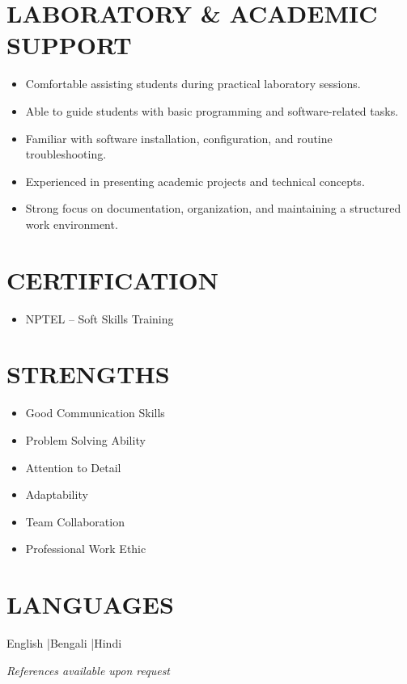 \documentclass[a4paper,10pt]{article}
\begin{document}
\section{LABORATORY \& ACADEMIC SUPPORT}
\begin{itemize}[leftmargin=*, noitemsep, topsep=2pt]
    \item Comfortable assisting students during practical laboratory sessions.
    \item Able to guide students with basic programming and software-related tasks.
    \item Familiar with software installation, configuration, and routine troubleshooting.
    \item Experienced in presenting academic projects and technical concepts.
    \item Strong focus on documentation, organization, and maintaining a structured work environment.
\end{itemize}

\section{CERTIFICATION}
\begin{itemize}[leftmargin=*, noitemsep, topsep=2pt]
    \item NPTEL – Soft Skills Training
\end{itemize}

\section{STRENGTHS}
\begin{itemize}[leftmargin=*, noitemsep, topsep=2pt, itemsep=2pt]
    \item Good Communication Skills
    \item Problem Solving Ability
    \item Attention to Detail
    \item Adaptability
    \item Team Collaboration
    \item Professional Work Ethic
\end{itemize}

\section{LANGUAGES}
English \quad|\quad Bengali \quad|\quad Hindi

\vspace{8pt}

\begin{center}
    \textit{References available upon request}
\end{center}
\end{document}
